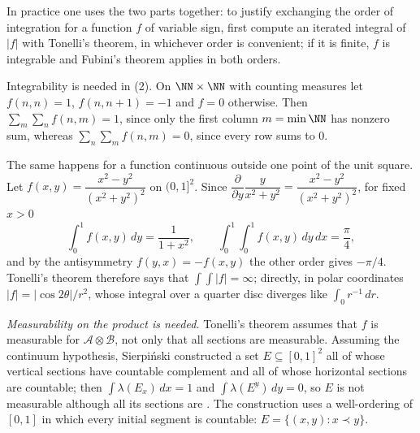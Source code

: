 In practice one uses the two parts together: to justify exchanging the order of integration for a function $f$ of variable sign, first compute an iterated integral of $|f|$ with Tonelli's theorem,
in whichever order is convenient; if it is finite, $f$ is integrable and Fubini's theorem applies in both orders.

\begin{counterexample}\label{measure-theory:counterexample-fubini}
Integrability is needed in (2). On $\NN \times \NN$ with counting measures let $f(n, n) = 1$, $f(n, n+1) = -1$ and $f = 0$ otherwise. Then $\sum_m\sum_nf(n, m) = 1$, since only the first column $m = \min\NN$ has nonzero
sum, whereas $\sum_n\sum_mf(n, m) = 0$, since every row sums to $0$.
\end{counterexample}

\begin{counterexample}\label{measure-theory:counterexample-fubini-continuous}
The same happens for a function continuous outside one point of the unit square. Let $f(x, y) = \dfrac{x^2 - y^2}{(x^2 + y^2)^2}$ on $(0, 1]^2$. Since
$\dfrac{\partial}{\partial y}\dfrac{y}{x^2 + y^2} = \dfrac{x^2 - y^2}{(x^2 + y^2)^2}$, for fixed $x > 0$
\[
\int_0^1f(x, y)\,dy = \frac{1}{1 + x^2}, \qquad \int_0^1\int_0^1f(x, y)\,dy\,dx = \frac\pi4,
\]
and by the antisymmetry $f(y, x) = -f(x, y)$ the other order gives $-\pi/4$. Tonelli's theorem therefore says that $\int\!\!\int|f| = \infty$; directly, in polar coordinates $|f| = |\cos2\theta|/r^2$, whose
integral over a quarter disc diverges like $\int_0r^{-1}\,dr$.
\end{counterexample}

\begin{remark}\label{measure-theory:remark-fubini-measurability}
\emph{Measurability on the product is needed.} Tonelli's theorem assumes that $f$ is measurable for $\mathcal{A} \otimes \mathcal{B}$, not only that all sections are measurable. Assuming the
continuum hypothesis, Sierpi\'nski constructed a set $E \subseteq [0, 1]^2$ all of whose vertical sections have countable complement and all of whose horizontal sections are countable; then
$\int\lambda(E_x)\,dx = 1$ and $\int\lambda(E^y)\,dy = 0$, so $E$ is not measurable although all its sections are \cite[Chapter 8]{rudin-rca}. The construction uses a well-ordering of $[0, 1]$ in which
every initial segment is countable: $E = \{(x, y) : x \prec y\}$.
\end{remark}

